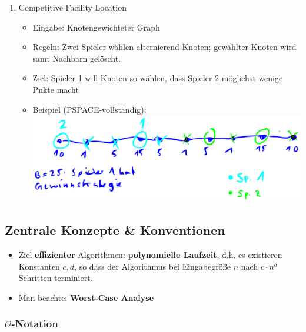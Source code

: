 \documentclass{scrartcl}
\begin{document}
\begin{enumerate}
	\item Competitive Facility Location
	\begin{itemize}
		\item Eingabe: Knotengewichteter Graph
		\item Regeln: Zwei Spieler wählen alternierend Knoten; gewählter Knoten wird samt Nachbarn gelöscht.
		\item Ziel: Spieler 1 will Knoten so wählen, dass Spieler 2 möglichst wenige Pnkte macht
		\item Beispiel (PSPACE-vollständig): \\
		\includegraphics[width=\linewidth]{figures/competitive-facility-location.pdf}
	\end{itemize}
\end{enumerate}

\subsection{Zentrale Konzepte \& Konventionen}

\begin{itemize}
	\item Ziel \textbf{effizienter} Algorithmen: \textbf{polynomielle Laufzeit}, d.h. es existieren Konstanten $ c,d $, so dass der Algorithmus bei Eingabegröße $ n $ nach $ c \cdot n^d $ Schritten terminiert.
	\item Man beachte: \textbf{Worst-Case Analyse}
\end{itemize}

\subsubsection{$ \mathcal{O} $-Notation}
\end{document}
